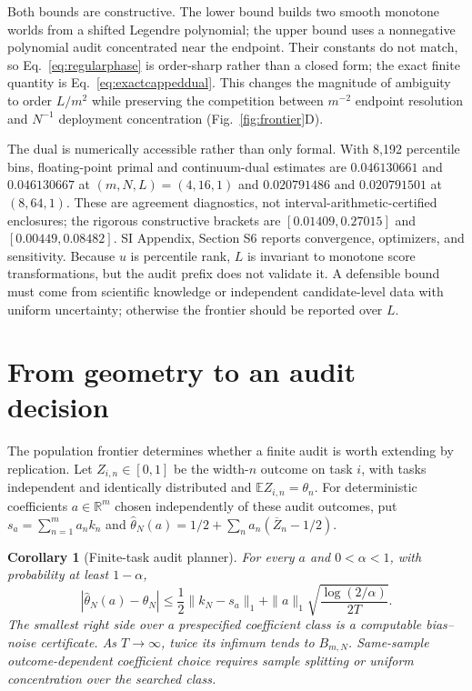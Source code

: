 \documentclass[10pt,twocolumn]{article}
\newtheorem{corollary}{Corollary}
\newcommand{\E}{\mathbb{E}}
\begin{document}
Both bounds are constructive. The lower bound builds two smooth monotone worlds from a shifted Legendre polynomial; the upper bound uses a nonnegative polynomial audit concentrated near the endpoint. Their constants do not match, so Eq.~\ref{eq:regularphase} is order-sharp rather than a closed form; the exact finite quantity is Eq.~\ref{eq:exactcappeddual}. This changes the magnitude of ambiguity to order $L/m^2$ while preserving the competition between $m^{-2}$ endpoint resolution and $N^{-1}$ deployment concentration (Fig.~\ref{fig:frontier}D).

The dual is numerically accessible rather than only formal. With 8,192 percentile bins, floating-point primal and continuum-dual estimates are $0.046130661$ and $0.046130667$ at $(m,N,L)=(4,16,1)$ and $0.020791486$ and $0.020791501$ at $(8,64,1)$. These are agreement diagnostics, not interval-arithmetic-certified enclosures; the rigorous constructive brackets are $[0.01409,0.27015]$ and $[0.00449,0.08482]$. SI Appendix, Section S6 reports convergence, optimizers, and sensitivity. Because $u$ is percentile rank, $L$ is invariant to monotone score transformations, but the audit prefix does not validate it. A defensible bound must come from scientific knowledge or independent candidate-level data with uniform uncertainty; otherwise the frontier should be reported over $L$.

\section*{From geometry to an audit decision}

The population frontier determines whether a finite audit is worth extending by replication. Let $Z_{i,n}\in[0,1]$ be the width-$n$ outcome on task $i$, with tasks independent and identically distributed and $\E Z_{i,n}=\theta_n$. For deterministic coefficients $a\in\mathbb R^m$ chosen independently of these audit outcomes, put $s_a=\sum_{n=1}^ma_nk_n$ and $\widehat\theta_N(a)=1/2+\sum_na_n(\overline Z_n-1/2)$.

\begin{corollary}[Finite-task audit planner]
\label{cor:finiteplanner}
For every $a$ and $0<\alpha<1$, with probability at least $1-\alpha$,
\begin{equation}
|\widehat\theta_N(a)-\theta_N|
\le \frac12\|k_N-s_a\|_1
+\|a\|_1\sqrt{\frac{\log(2/\alpha)}{2T}}.
\label{eq:finiteplanner}
\end{equation}
The smallest right side over a prespecified coefficient class is a computable bias--noise certificate. As $T\to\infty$, twice its infimum tends to $B_{m,N}$. Same-sample outcome-dependent coefficient choice requires sample splitting or uniform concentration over the searched class.
\end{corollary}
\end{document}
